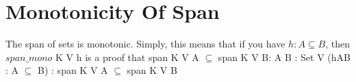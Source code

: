 \section{Monotonicity Of Span}

\begin{theorem}
  \label{theorem : span_mono}
  \leanok
  The span of sets is monotonic. Simply, this means that if you have $h : A \subseteq B$, then $span\_mono$ K V h is a proof that span K V A $\subseteq$ span K V B: {A B : Set V} (hAB : A $\subseteq$ B) : span K V A $\subseteq$ span K V B
\end{theorem}
